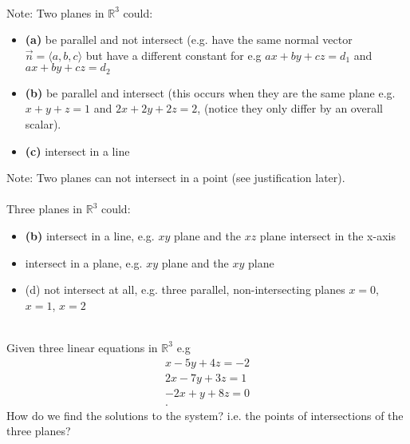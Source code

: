 \documentclass{report}
\begin{document}
\\
Note: Two planes in $\mathbb{R}^3$ could:
\begin{itemize}
        \item \textbf{(a)} be parallel and not intersect (e.g. have the same normal vector $\vec{n} = \langle a,b,c  \rangle $ but have a different constant for e.g $ax + by +cz =d_1$ and $ax+by+cz =d_2$
        \item \textbf{(b)}  be parallel and intersect (this occurs when they are the same plane e.g. $x+y+z=1$ and $2x +2y +2z =2$, (notice they only differ by an overall scalar).
        \item \textbf{(c)} intersect in a line
\end{itemize}
Note: Two planes can not intersect in a point (see justification later).\\
\\
Three planes in $\mathbb{R}^3 $ could:
\begin{itemize}
        \textbf{(a)} intersect in a point e.g. $xy$, $yz$ and $xz$ plane intersect at the origin $\left( 0,0,0 \right) $
        \item \textbf{(b)} intersect in a line, e.g. $xy$ plane and the $xz$ plane intersect in the x-axis
        \item intersect in a plane, e.g.  $xy$ plane and the $xy$ plane
        \item (d) not intersect at all, e.g. three parallel, non-intersecting planes $x=0$,  $x=1$, $x=2$
\end{itemize}
\\
Given three linear equations in $\mathbb{R}^3$ e.g
\begin{align*}
        x-5y+4z=-2\\
        2x-7y+3z=1\\
        -2x +y +8z=0\\
.\end{align*}
How do we find the solutions to the system? i.e. the points of intersections of the three planes?
\end{document}
